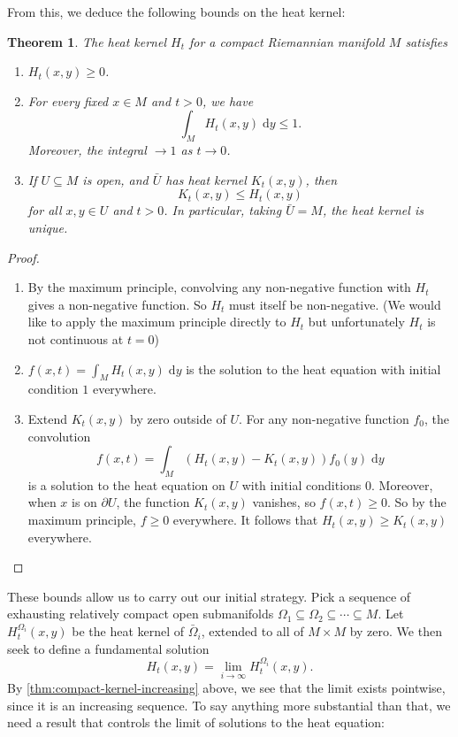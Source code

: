 \documentclass{shortart}
\newtheorem{thm}{Theorem}[section]
\theoremstyle{definition}
\renewcommand\d{\mathrm{d}}
\begin{document}
From this, we deduce the following bounds on the heat kernel:
\begin{thm}\label{thm:compact-kernel-prop}
  The heat kernel $H_t$ for a compact Riemannian manifold $M$ satisfies
  \begin{enumerate}
    \item $H_t(x, y) \geq 0$.\label{thm:compact-kernel-positive}
    \item For every fixed $x \in M$ and $t > 0$, we have\label{thm:compact-kernel-bound}
      \[
        \int_M H_t(x, y)\;\d y \leq 1.
      \]
      Moreover, the integral $\to 1$ as $t \to 0$.
    \item If $U \subseteq M$ is open, and $\bar{U}$ has heat kernel $K_t(x, y)$, then\label{thm:compact-kernel-increasing}
      \[
        K_t(x, y) \leq H_t(x, y)
      \]
      for all $x, y \in U$ and $t > 0$. In particular, taking $\bar{U} = M$, the heat kernel is unique.
  \end{enumerate}
\end{thm}

\begin{proof}\leavevmode
  \begin{enumerate}
    \item By the maximum principle, convolving any non-negative function with $H_t$ gives a non-negative function. So $H_t$ must itself be non-negative. (We would like to apply the maximum principle directly to $H_t$ but unfortunately $H_t$ is not continuous at $t = 0$)
    \item $f(x, t) = \int_M H_t(x, y)\;\d y$ is the solution to the heat equation with initial condition $1$ everywhere.
    \item Extend $K_t(x, y)$ by zero outside of $U$. For any non-negative function $f_0$, the convolution
      \[
        f(x, t) = \int_M (H_t(x, y) - K_t(x, y)) f_0(y) \;\d y
      \]
      is a solution to the heat equation on $U$ with initial conditions $0$. Moreover, when $x$ is on $\partial U$, the function $K_t(x, y)$ vanishes, so $f(x, t) \geq 0$. So by the maximum principle, $f \geq 0$ everywhere. It follows that $H_t(x, y) \geq K_t(x, y)$ everywhere.\qedhere
  \end{enumerate}
\end{proof}

These bounds allow us to carry out our initial strategy. Pick a sequence of exhausting relatively compact open submanifolds $\Omega_1 \subseteq \Omega_2 \subseteq \cdots \subseteq M$. Let $H_t^{\Omega_i}(x, y)$ be the heat kernel of $\bar{\Omega}_i$, extended to all of $M \times M$ by zero. We then seek to define a fundamental solution
\[
  H_t(x, y) = \lim_{i \to \infty} H_t^{\Omega_i}(x, y).
\]
By \ref{thm:compact-kernel-increasing} above, we see that the limit exists pointwise, since it is an increasing sequence. To say anything more substantial than that, we need a result that controls the limit of solutions to the heat equation:
\end{document}
